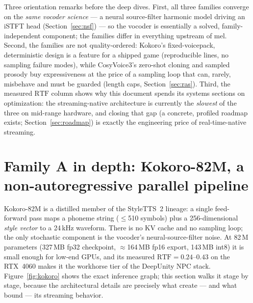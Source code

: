 \documentclass[11pt,a4paper]{article}
\newcommand{\RTF}{\ensuremath{\mathrm{RTF}}}
\begin{document}
Three orientation remarks before the deep dives. First, all three families converge on
the \emph{same vocoder science} --- a neural source-filter harmonic model driving an
iSTFT head (Section~\ref{sec:nsf}) --- so the vocoder is essentially a solved,
family-independent component; the families differ in everything upstream of mel.
Second, the families are not quality-ordered: Kokoro's fixed-voicepack, deterministic
design is a feature for a shipped game (reproducible lines, no sampling failure modes),
while CosyVoice3's zero-shot cloning and sampled prosody buy expressiveness at the price
of a sampling loop that can, rarely, misbehave and must be guarded (length caps,
Section~\ref{sec:ras}). Third, the measured \RTF{} column shows why this document spends
its systems sections on optimization: the streaming-native architecture is currently the
\emph{slowest} of the three on mid-range hardware, and closing that gap (a concrete,
profiled roadmap exists; Section~\ref{sec:roadmap}) is exactly the engineering price of
real-time-native streaming.

\section{Family A in depth: Kokoro-82M, a non-autoregressive parallel pipeline}
\label{sec:kokoro}

Kokoro-82M is a distilled member of the StyleTTS~2 lineage: a single feed-forward pass
maps a phoneme string ($\le$510 symbols) plus a 256-dimensional \emph{style vector} to a
24\,kHz waveform. There is no KV cache and no sampling loop; the only stochastic
component is the vocoder's neural-source-filter noise. At 82\,M parameters (327\,MB
fp32 checkpoint, $\approx$164\,MB fp16 export, 143\,MB int8) it is small enough for
low-end GPUs, and its measured $\RTF = 0.24$--$0.43$ on the RTX~4060 makes it the
workhorse tier of the DeepUnity NPC stack. Figure~\ref{fig:kokoro} shows the exact
inference graph; this section walks it stage by stage, because the architectural details
are precisely what create --- and what bound --- its streaming behavior.
\end{document}
